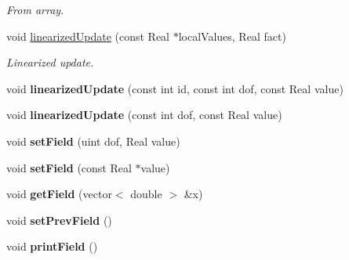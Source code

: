 \begin{DoxyCompactItemize}
\begin{DoxyCompactList}\small\item\em From array. \item\end{DoxyCompactList}\item 
\hypertarget{classvoom_1_1_gauge_model_a20a78ea7555787a8728ee60776011a36}{
void \hyperlink{classvoom_1_1_gauge_model_a20a78ea7555787a8728ee60776011a36}{linearizedUpdate} (const Real $\ast$localValues, Real fact)}
\label{classvoom_1_1_gauge_model_a20a78ea7555787a8728ee60776011a36}

\begin{DoxyCompactList}\small\item\em Linearized update. \item\end{DoxyCompactList}\item 
\hypertarget{classvoom_1_1_gauge_model_a08d83ad49c05e70b46113ef769b99c98}{
void {\bfseries linearizedUpdate} (const int id, const int dof, const Real value)}
\label{classvoom_1_1_gauge_model_a08d83ad49c05e70b46113ef769b99c98}

\item 
\hypertarget{classvoom_1_1_gauge_model_ab2e9e1828d50d53998e13852a0df2425}{
void {\bfseries linearizedUpdate} (const int dof, const Real value)}
\label{classvoom_1_1_gauge_model_ab2e9e1828d50d53998e13852a0df2425}

\item 
\hypertarget{classvoom_1_1_gauge_model_a012169855afaf5a1841d25fa5f1d252b}{
void {\bfseries setField} (uint dof, Real value)}
\label{classvoom_1_1_gauge_model_a012169855afaf5a1841d25fa5f1d252b}

\item 
\hypertarget{classvoom_1_1_gauge_model_a351b9af0145f76e85aa6b8167d9f82bf}{
void {\bfseries setField} (const Real $\ast$value)}
\label{classvoom_1_1_gauge_model_a351b9af0145f76e85aa6b8167d9f82bf}

\item 
\hypertarget{classvoom_1_1_gauge_model_aa160275f701f51d43e817c04d285ef52}{
void {\bfseries getField} (vector$<$ double $>$ \&x)}
\label{classvoom_1_1_gauge_model_aa160275f701f51d43e817c04d285ef52}

\item 
\hypertarget{classvoom_1_1_gauge_model_afd509c41cd2f36b97a3a52fc92ba256d}{
void {\bfseries setPrevField} ()}
\label{classvoom_1_1_gauge_model_afd509c41cd2f36b97a3a52fc92ba256d}

\item 
\hypertarget{classvoom_1_1_gauge_model_a6fd135370b1b72876998947dbceb2227}{
void {\bfseries printField} ()}
\label{classvoom_1_1_gauge_model_a6fd135370b1b72876998947dbceb2227}


\end{DoxyCompactItemize}
